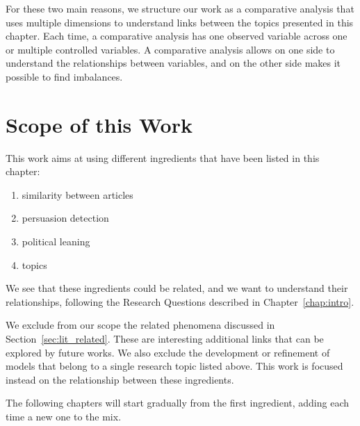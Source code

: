 
For these two main reasons, we structure our work as a comparative analysis that uses multiple dimensions to understand links between the topics presented in this chapter.
Each time, a comparative analysis has one observed variable across one or multiple controlled variables.
A comparative analysis allows on one side to understand the relationships between variables, and on the other side makes it possible to find imbalances.

\section{\statusgreen Scope of this Work}
\label{sec:lit_scope}

This work aims at using different ingredients that have been listed in this chapter:
\begin{enumerate}
    \item similarity between articles
    \item persuasion detection
    \item political leaning
    \item topics
\end{enumerate}

We see that these ingredients could be related, and we want to understand their relationships, following the Research Questions described in Chapter~\ref{chap:intro}.

We exclude from our scope the related phenomena discussed in Section~\ref{sec:lit_related}. These are interesting additional links that can be explored by future works.
We also exclude the development or refinement of models that belong to a single research topic listed above. This work is focused instead on the relationship between these ingredients.

The following chapters will start gradually from the first ingredient, adding each time a new one to the mix. 
